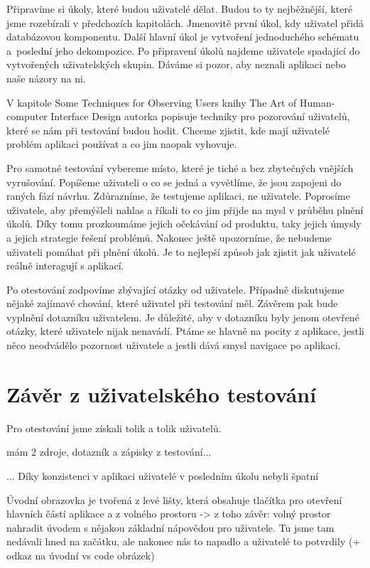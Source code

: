 Připravíme si úkoly, které budou uživatelé dělat. Budou to ty nejběžnější, které jsme rozebírali v předchozích kapitolách. Jmenovitě první úkol, kdy uživatel přidá databázovou komponentu. Další hlavní úkol je vytvoření jednoduchého schématu a~poslední jeho dekompozice.
Po připravení úkolů najdeme uživatele spadající do vytvořených uživatelských skupin. Dáváme si pozor, aby neznali aplikaci nebo naše názory na ni.

V kapitole Some Techniques for Observing Users knihy The Art of Human-computer Interface Design \cite{Brenda_1990_art} autorka popisuje techniky pro pozorování uživatelů, které se nám při testování budou hodit. Chceme zjistit, kde mají uživatelé problém aplikaci používat a co jim naopak vyhovuje.

Pro samotné testování vybereme místo, které je tiché a bez zbytečných vnějších vyrušování. Popíšeme uživateli o co se jedná a vyvětlíme, že jsou zapojeni do raných fází návrhu. Zdůrazníme, že testujeme aplikaci, ne uživatele. Poprosíme uživatele, aby přemýšleli nahlas a říkali to co jim přijde na mysl v průběhu plnění úkolů. Díky tomu prozkoumáme jejich očekávání od produktu, taky jejich úmysly a jejich strategie řešení problémů. Nakonec ještě upozorníme, že nebudeme uživateli pomáhat při plnění úkolů. Je to nejlepší způsob jak zjistit jak uživatelé reálně interagují s aplikací.

Po otestování zodpovíme zbývající otázky od uživatele. Případně diskutujeme nějaké zajímavé chování, které uživatel při testování měl. Závěrem pak bude vyplnění dotazníku uživatelem. Je důležité, aby v dotazníku byly jenom otevřené otázky, které uživatele nijak nenavádí. Ptáme se hlavně na pocity z aplikace, jestli něco neodvádělo pozornost uživatele a jestli dává smysl navigace po aplikaci.

\section{Závěr z uživatelského testování}


Pro otestování jsme získali tolik a tolik uživatelů.

mám 2 zdroje, dotazník a zápisky z testování...

... Díky konzistenci v aplikaci uživatelé v posledním úkolu nebyli špatní

Úvodní obrazovka je tvořená z levé lišty, která obsahuje tlačítka pro otevření hlavních částí aplikace a z volného prostoru -> z toho závěr: volný prostor nahradit úvodem s nějakou základní nápovědou pro uživatele. Tu jsme tam nedávali hned na začátku, ale nakonec nás to napadlo a uživatelé to potvrdily (+ odkaz na úvodní vs code obrázek)